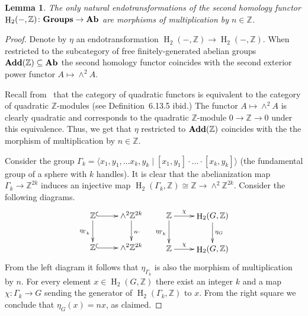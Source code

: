 \documentclass[oneside, 12pt]{amsart}
\theoremstyle{plain}
\numberwithin{equation}{section}
\newtheorem{lemma}{Lemma}
\numberwithin{lemma}{section}
\theoremstyle{remark}
\theoremstyle{definition}
\newcommand{\catname}[1]{{\normalfont\textbf{#1}}}
\DeclareMathOperator{\HH}{H}
\newcommand{\ZZ}{\mathbb{Z}}
\begin{document}
\begin{lemma} \label{lm:endotr} The only natural endotransformations of the second homology functor $\HH_2(-, \ZZ)\colon \catname{Groups}\to \catname{Ab}$ 
 are morphisms of multiplication by $n \in \ZZ$.
\end{lemma}
\begin{proof}
 Denote by $\eta$ an endotransformation $\HH_2(-, \ZZ) \to \HH_2(-, \ZZ)$.
 When restricted to the subcategory of free finitely-generated abelian groups $\catname{Add}(\ZZ) \subseteq \catname{Ab}$ the second homology functor
 coincides with the second exterior power functor $A \mapsto \wedge^2A$. 
 
 Recall from~\cite[Theorem~6.13.12]{Ba96} that the category of quadratic functors is equivalent to the category of quadratic $\ZZ$-modules (see Definition~6.13.5 ibid.)
 The functor $A \mapsto \wedge^2A$ is clearly quadratic and corresponds to the quadratic $\ZZ$-module $0 \to \ZZ \to 0$ under this equivalence.
 Thus, we get that $\eta$ restricted to $\catname{Add}(\ZZ)$ coincides with the the morphism of multiplication by $n\in \ZZ$.
 
 Consider the group $\Gamma_k = \langle x_1, y_1, \ldots x_k, y_k \mid [x_1, y_1]\cdot \ldots \cdot [x_k, y_k] \rangle$ (the fundamental group of a sphere with $k$ handles).
 It is clear that the abelianization map $\Gamma_k \to \ZZ^{2k}$ induces an injective map $\HH_2(\Gamma_k, \ZZ) \cong \ZZ \to \wedge^2\ZZ^{2k}$.  
 Consider the following diagrams.
  \[ \xymatrix{ \ZZ \ar@{^{(}->}[r] \ar[d]_{\eta_{\Gamma_k}} & \ar[d]^{n \cdot} \wedge^2\ZZ^{2k} \\
                \ZZ \ar@{^{(}->}[r]                          & \wedge^2\ZZ^{2k} } \ \ \ 
     \xymatrix{   \ZZ  \ar[r]^(.35){\chi} \ar[d]_{\eta_{\Gamma_k}} & \ar[d]^{\eta_G} \HH_2(G, \ZZ) \\
                  \ZZ  \ar[r]^(.35){\chi}                          & \HH_2(G, \ZZ)}  \]
 From the left diagram it follows that $\eta_{\Gamma_k}$ is also the morphism of multiplication by $n$.
 For every element $x\in \HH_2(G, \ZZ)$ there exist an integer $k$ and a map $\chi\colon \Gamma_k\to G$ sending the generator of $\HH_2(\Gamma_k, \ZZ)$ to $x$.
 From the right square we conclude that $\eta_G(x) = nx$, as claimed.
\end{proof}
\end{document}
